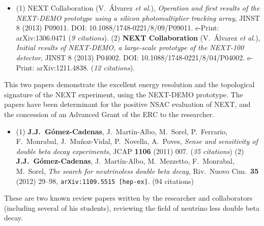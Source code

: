 \begin{itemize}
\item (1) {NEXT Collaboration} (V.~\'Alvarez {\it et al.}), \textit{	
Operation and first results of the NEXT-DEMO prototype using a silicon photomultiplier tracking array}, 
JINST 8 (2013) P09011. DOI: 10.1088/1748-0221/8/09/P09011. 
e-Print: arXiv:1306.0471 ({\it 9 citations}).
(2) {\bf NEXT Collaboration} (V.~\'Alvarez {\it et al.}), \textit{Initial results of NEXT-DEMO, a large-scale prototype of the NEXT-100 detector},  JINST 8 (2013) P04002. 
DOI: 10.1088/1748-0221/8/04/P04002. 
e-Print: arXiv:1211.4838.  ({\it 12 citations}).
\end{itemize}
This two papers demonstrate the excellent energy resolution and the topological signature of the NEXT experiment, using the  NEXT-DEMO prototype. The papers have been determinant for the positive NSAC evaluation of NEXT, and the concession of an Advanced Grant of the ERC to the researcher. 

\begin{itemize}
\item (1) {\bf J.J.~G\'omez-Cadenas}, J.~Mart\'in-Albo, M.~Sorel, P.~Ferrario, F.~Monrabal, J.~Mu\~noz-Vidal, P.~Novella, A.~Poves, \textit{Sense and sensitivity of double beta decay experiments}, JCAP {\bf 1106} (2011) 007. ({\it 35 citations})  
(2) {\bf J.J.~G\'omez-Cadenas}, J.~Mart\'in-Albo, M.~Mezzetto, F.~Monrabal, M.~Sorel, {\em The search for neutrinoless double beta decay}, Riv.\ Nuovo Cim.\ {\bf35} (2012) 29--98, {\tt arXiv:1109.5515 [hep-ex]}. (94 citations)
\end{itemize}
These are two known review papers written by the researcher and collaborators (including several of his students), reviewing the field of neutrino less double beta decay.  

